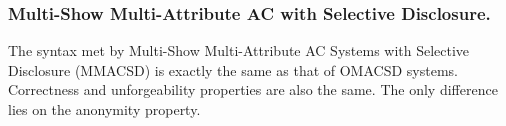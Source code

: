 \subsubsection{Multi-Show Multi-Attribute AC with Selective Disclosure.} %
The syntax met by Multi-Show Multi-Attribute AC Systems with Selective
Disclosure (MMACSD) is exactly the same as that of OMACSD systems. Correctness
and unforgeability properties are also the same. The only difference lies on
the anonymity property.

